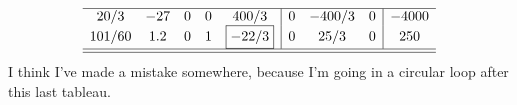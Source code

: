 \documentclass{homework}
\begin{document}
\begin{enumerate}
\[\begin{array}{ccccc|ccc|cl}
				\hline
				20/3 & -27 & 0 & 0 & 400/3 & 0 & -400/3 & 0 & -4000 \\
				101/60 & 1.2 & 0 & 1 & \boxed{-22/3} & 0 & 25/3 & 0 & 250 \\
				\hline \hline
			\end{array}
		\]
		I think I've made a mistake somewhere, because I'm going in a circular loop after this last tableau. 

\end{enumerate}
\end{document}
